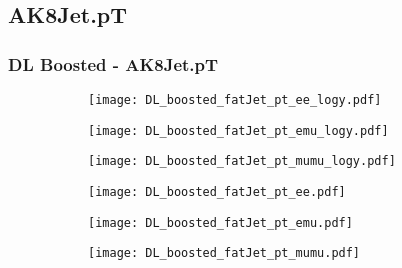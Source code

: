 \documentclass[aspectratio=169,8pt]{beamer}
\begin{document}
\subsection{AK8Jet.pT}
\begin{frame}
\frametitle{DL Boosted - AK8Jet.pT}
\begin{figure}
\captionsetup[subfigure]{labelformat=empty}
\begin{subfigure}{0.32\textwidth}
\texttt{[image: DL\_boosted\_fatJet\_pt\_ee\_logy.pdf]}
\vspace*{-0.15cm}
\end{subfigure}
\hfil
\begin{subfigure}{0.32\textwidth}
\texttt{[image: DL\_boosted\_fatJet\_pt\_emu\_logy.pdf]}
\vspace*{-0.15cm}
\end{subfigure}
\hfil
\begin{subfigure}{0.32\textwidth}
\texttt{[image: DL\_boosted\_fatJet\_pt\_mumu\_logy.pdf]}
\vspace*{-0.15cm}
\end{subfigure}
\hfil
\begin{subfigure}{0.32\textwidth}
\texttt{[image: DL\_boosted\_fatJet\_pt\_ee.pdf]}
\vspace*{-0.15cm}
\end{subfigure}
\hfil
\begin{subfigure}{0.32\textwidth}
\texttt{[image: DL\_boosted\_fatJet\_pt\_emu.pdf]}
\vspace*{-0.15cm}
\end{subfigure}
\hfil
\begin{subfigure}{0.32\textwidth}
\texttt{[image: DL\_boosted\_fatJet\_pt\_mumu.pdf]}
\vspace*{-0.15cm}
\end{subfigure}
\hfil
\end{figure}
\end{frame}
\newpage
\end{document}
